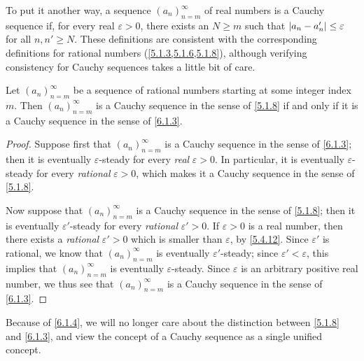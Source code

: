 \begin{note}
  To put it another way, a sequence \((a_n)_{n = m}^\infty\) of real numbers is a Cauchy sequence if, for every real \(\varepsilon > 0\), there exists an \(N \geq m\) such that \(\left\lvert a_n - a_n'\right\rvert \leq \varepsilon\) for all \(n, n' \geq N\).
  These definitions are consistent with the corresponding definitions for rational numbers (\cref{5.1.3,5.1.6,5.1.8}), although verifying consistency for Cauchy sequences takes a little bit of care.
\end{note}

\begin{prop}\label{6.1.4}
  Let \((a_n)_{n = m}^\infty\) be a sequence of rational numbers starting at some integer index \(m\).
  Then \((a_n)_{n = m}^\infty\) is a Cauchy sequence in the sense of \cref{5.1.8} if and only if it is a Cauchy sequence in the sense of \cref{6.1.3}.
\end{prop}

\begin{proof}
  Suppose first that \((a_n)_{n = m}^\infty\) is a Cauchy sequence in the sense of \cref{6.1.3};
  then it is eventually \(\varepsilon\)-steady for every \emph{real} \(\varepsilon > 0\).
  In particular, it is eventually \(\varepsilon\)-steady for every \emph{rational} \(\varepsilon > 0\), which makes it a Cauchy sequence in the sense of \cref{5.1.8}.

  Now suppose that \((a_n)_{n = m}^\infty\) is a Cauchy sequence in the sense of \cref{5.1.8};
  then it is eventually \(\varepsilon'\)-steady for every \emph{rational} \(\varepsilon' > 0\).
  If \(\varepsilon > 0\) is a real number, then there exists a \emph{rational} \(\varepsilon' > 0\) which is smaller than \(\varepsilon\), by \cref{5.4.12}.
  Since \(\varepsilon'\) is rational, we know that \((a_n)_{n = m}^\infty\) is eventually \(\varepsilon'\)-steady;
  since \(\varepsilon' < \varepsilon\), this implies that \((a_n)_{n = m}^\infty\) is eventually \(\varepsilon\)-steady.
  Since \(\varepsilon\) is an arbitrary positive real number, we thus see that \((a_n)_{n = m}^\infty\) is a Cauchy sequence in the sense of \cref{6.1.3}.
\end{proof}

\begin{note}
  Because of \cref{6.1.4}, we will no longer care about the distinction between \cref{5.1.8} and \cref{6.1.3}, and view the concept of a Cauchy sequence as a single unified concept.
\end{note}

